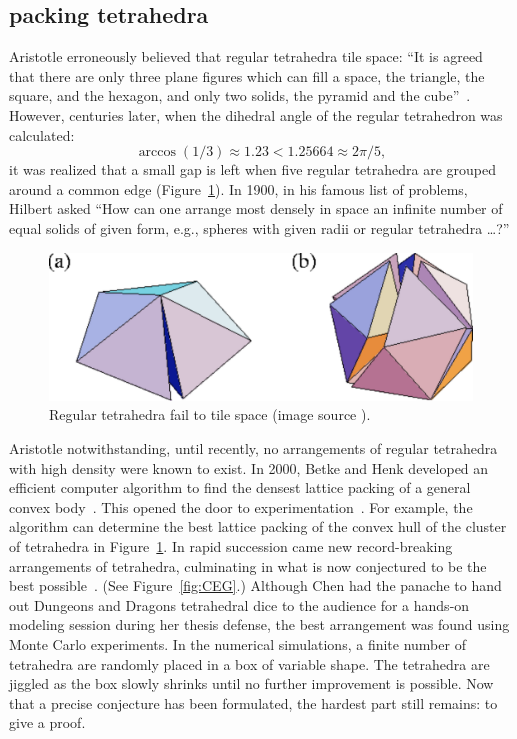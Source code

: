 \documentclass{llncs}
\begin{document}
\subsection{packing  tetrahedra}

Aristotle erroneously believed that regular tetrahedra tile space:
``It is agreed that there are only three plane figures which can fill
a space, the triangle, the square, and the hexagon, and only two
solids, the pyramid and the cube''~\cite{Aristotle}.  However,
centuries later, when the dihedral angle of the regular tetrahedron
was calculated:
\[
\arccos(1/3) \approx 1.23 < 1.25664 \approx 2\pi/5,
\]
it was realized that a small gap is left when five regular tetrahedra
are grouped around a common edge (Figure~\ref{fig:gap}).  In 1900, in
his famous list of problems, Hilbert asked ``How can one arrange most
densely in space an infinite number of equal solids of given form,
e.g., spheres with given radii or regular tetrahedra \dots?''

\begin{figure}[h!]
  \centering
\includegraphics[scale=0.3]{tetrahedral_defect.pdf}
  \caption{Regular tetrahedra fail to tile space (image source \cite{tetrahedra}).}
\label{fig:gap}
\end{figure}

Aristotle notwithstanding, until recently, no arrangements of regular
tetrahedra with high density were known to exist.  In 2000, Betke and
Henk developed an efficient computer algorithm to find the densest
lattice packing of a general convex body~\cite{BH2000}.  This opened
the door to experimentation~\cite{Conway-2006}.  For example,
the algorithm can determine the best lattice packing of the convex hull
of the cluster of tetrahedra in Figure~\ref{fig:gap}.  In rapid succession
came new record-breaking arrangements of tetrahedra, culminating in
what is now conjectured to be the best possible~\cite{Chen-2010}.
(See Figure~\ref{fig:CEG}.)  Although Chen had the panache to hand out
Dungeons and Dragons tetrahedral dice to the audience for a hands-on
modeling session during her thesis defense, the best arrangement was
found using Monte Carlo experiments.  In the numerical simulations, a
finite number of tetrahedra are randomly placed in a box of variable
shape.  The tetrahedra are jiggled as the box slowly shrinks until
no further improvement is possible.  Now that a precise conjecture has
been formulated, the hardest part still remains: to give a proof.
\end{document}
